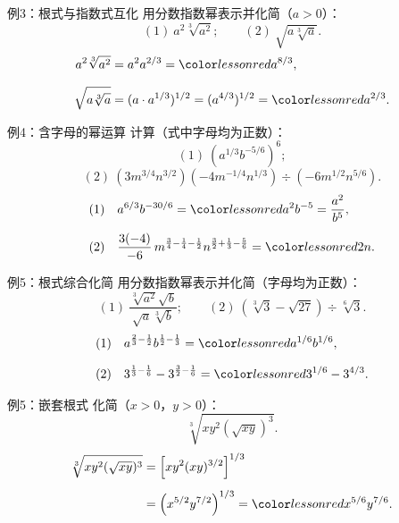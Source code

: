 \documentclass[aspectratio=169,10pt]{beamer}
\begin{document}
\begin{frame}[t]{例3：根式与指数式互化}
 用分数指数幂表示并化简（$a>0$）：
 \[(1)\ a^2\sqrt[3]{a^2};\qquad (2)\ \sqrt{a\sqrt[3]a}.\]
 \pause
 \begin{align*}
  a^2\sqrt[3]{a^2}&=a^2a^{2/3}=\ans{a^{8/3}},\\[.7em]
  \sqrt{a\sqrt[3]a}&=(a\cdot a^{1/3})^{1/2}
                  =(a^{4/3})^{1/2}=\ans{a^{2/3}}.
 \end{align*}
\end{frame}

\begin{frame}[t]{例4：含字母的幂运算}
 计算（式中字母均为正数）：
 \[(1)\ (a^{1/3}b^{-5/6})^6;\]
 \[(2)\ (3m^{3/4}n^{3/2})(-4m^{-1/4}n^{1/3})
          \div(-6m^{1/2}n^{5/6}).\]
 \pause
 \begin{align*}
  (1)&\quad a^{6/3}b^{-30/6}=\ans{a^2b^{-5}=\frac{a^2}{b^5}},\\[.5em]
  (2)&\quad\frac{3(-4)}{-6}\,
  m^{\frac34-\frac14-\frac12}n^{\frac32+\frac13-\frac56}
  =\ans{2n}.
 \end{align*}
\end{frame}

\begin{frame}[t]{例5：根式综合化简}
 用分数指数幂表示并化简（字母均为正数）：
 \[(1)\ \frac{\sqrt[3]{a^2}\sqrt b}{\sqrt a\sqrt[3]b};\qquad
   (2)\ (\sqrt[3]3-\sqrt{27})\div\sqrt[6]3.\]
 \pause
 \begin{align*}
  (1)&\quad a^{\frac23-\frac12}b^{\frac12-\frac13}
       =\ans{a^{1/6}b^{1/6}},\\[.7em]
  (2)&\quad 3^{\frac13-\frac16}-3^{\frac32-\frac16}
       =\ans{3^{1/6}-3^{4/3}}.
 \end{align*}
\end{frame}

\begin{frame}[t]{例5：嵌套根式}
 化简（$x>0$，$y>0$）：
 \[\sqrt[3]{xy^2(\sqrt{xy})^3}.\]
 \pause
 \begin{align*}
  \sqrt[3]{xy^2(\sqrt{xy})^3}
  &=\left[xy^2(xy)^{3/2}\right]^{1/3}\\[.5em]
  &=\left(x^{5/2}y^{7/2}\right)^{1/3}
    =\ans{x^{5/6}y^{7/6}}.
 \end{align*}
\end{frame}
\end{document}
